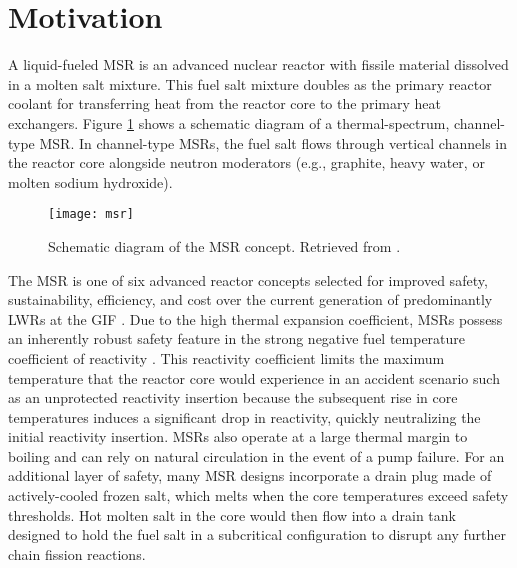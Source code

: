 \section{Motivation}

A liquid-fueled \gls{MSR} is an advanced nuclear reactor with fissile material
dissolved in a molten salt mixture. This fuel salt mixture doubles as the primary reactor coolant
for transferring heat from the reactor core to the primary heat exchangers. Figure \ref{fig:msr}
shows a schematic diagram of a thermal-spectrum, channel-type \gls{MSR}. In channel-type
\glspl{MSR}, the fuel salt flows through vertical channels in the reactor core alongside neutron
moderators (e.g., graphite, heavy water, or molten sodium hydroxide). 
%
\begin{figure}[htb!]
	\centering
	\texttt{[image: msr]}
	\caption{Schematic diagram of the \gls{MSR} concept. Retrieved from
	\cite{u.s._doe_nuclear_energy_research_advisory_committee_technology_2002}.}
	\label{fig:msr}
\end{figure}

The \gls{MSR} is one of six advanced reactor concepts selected for improved safety, sustainability,
efficiency, and cost over the current generation of predominantly \glspl{LWR} at the \gls{GIF}
\cite{u.s._doe_nuclear_energy_research_advisory_committee_technology_2002}.
Due to the high thermal expansion coefficient, \glspl{MSR} possess an inherently robust
safety feature in the strong negative fuel temperature coefficient of
reactivity \cite{elsheikh_safety_2013}. This reactivity coefficient limits the
maximum temperature that the reactor core would experience in an accident
scenario such as an unprotected reactivity insertion because the subsequent
rise in core temperatures induces a significant drop in reactivity,
quickly neutralizing the initial reactivity insertion. \glspl{MSR} also
operate at a large thermal margin to boiling and can rely on natural
circulation in the event of a pump failure. For an additional layer of safety, many \gls{MSR}
designs incorporate a drain plug made of actively-cooled frozen salt, which
melts when the core temperatures exceed safety thresholds. Hot molten salt
in the core would then flow into a drain tank designed to hold the fuel salt in
a subcritical configuration to disrupt any further chain fission reactions.

